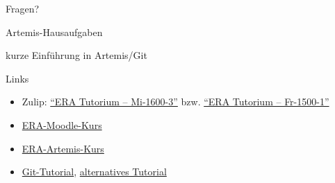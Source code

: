 \begin{frame}[c]{}{}
	\begin{center}
		\LARGE Fragen?
	\end{center}
\end{frame}

\begin{frame}[c]{Artemis-Hausaufgaben}{}
	\begin{center}
		\LARGE kurze Einführung in Artemis/Git
	\end{center}
\end{frame}

\begin{frame}[fragile, c]{Links}{}
	\begin{itemize}
		\item Zulip: \href{https://zulip.in.tum.de/#narrow/channel/3255-ERA-Tutorium-.E2.80.93-Mi-1600-3}{\enquote{ERA Tutorium -- Mi-1600-3}}
		      bzw. \href{https://zulip.in.tum.de/#narrow/channel/3264-ERA-Tutorium-.E2.80.93-Fr-1500-1}{\enquote{ERA Tutorium -- Fr-1500-1}}
		\item \href{https://www.moodle.tum.de/course/view.php?id=111440}{ERA-Moodle-Kurs}
		\item \href{https://artemis.in.tum.de/courses/516}{ERA-Artemis-Kurs}
		\item \href{https://git-scm.com/docs/gittutorial}{Git-Tutorial}, \href{https://rogerdudler.github.io/git-guide/}{alternatives Tutorial}
	\end{itemize}
\end{frame}

\maketitle



